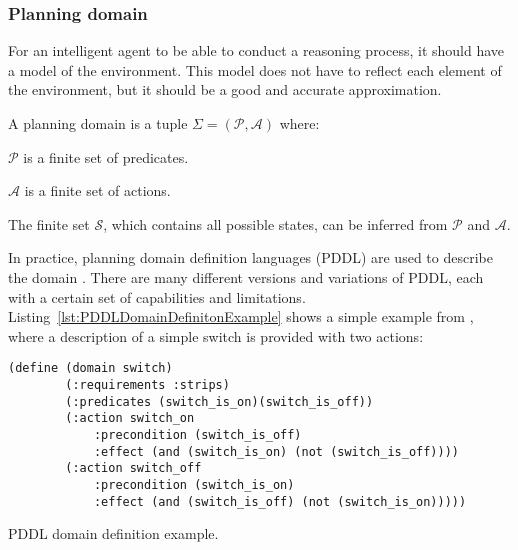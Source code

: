 \subsubsection{Planning domain}

For an intelligent agent to be able to conduct a reasoning process, 
it should have a model of the environment. 
This model does not have to reflect each element of the environment, 
but it should be a good and accurate approximation.
\begin{Tdef}

    A planning domain is a tuple $\Sigma= (\mathcal{P}, \mathcal{A})$ where:
    \vspace{-0.5em}
    \begin{compactitem}
        \item 
        $\mathcal{P}$ is a finite set of predicates.
        \item 
        $\mathcal{A}$ is a finite set of actions.
        \item 
        The finite set $\mathcal{S}$, which contains all possible states, can be inferred from $\mathcal{P}$ and $\mathcal{A}$.
    \end{compactitem}
    \vspace{-0.5em}
\end{Tdef}

In practice, planning domain definition languages (PDDL) are used to describe the domain \cite{aeronautiques1998pddl}. There are many different versions and variations of PDDL, each with a certain set of capabilities and limitations. 
Listing~\ref{lst:PDDLDomainDefinitonExample} shows a simple example from \cite{IntroductionPlanningDomainhaslum2019}, where a description of a simple switch is provided with two actions:

\begin{Listing}
    \begin{lstlisting}[language=PDDL]
    (define (domain switch)
        (:requirements :strips)
        (:predicates (switch_is_on)(switch_is_off))
        (:action switch_on
            :precondition (switch_is_off)
            :effect (and (switch_is_on) (not (switch_is_off))))
        (:action switch_off
            :precondition (switch_is_on)
            :effect (and (switch_is_off) (not (switch_is_on)))))
  \end{lstlisting}
    \caption{PDDL domain definition example.}
    \label{lst:PDDLDomainDefinitonExample}
\end{Listing}


